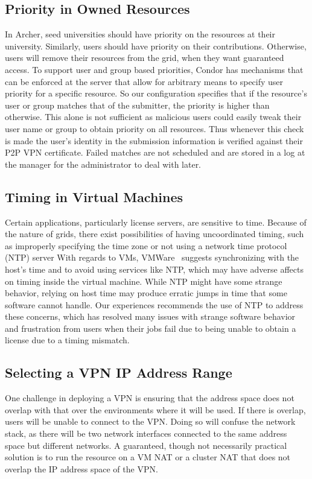 \documentclass[twocolumn]{svjour3}
\begin{document}
\subsection{Priority in Owned Resources}

In Archer, seed universities should have priority on the resources at their
university.  Similarly, users should have priority on their contributions.
Otherwise, users will remove their resources from the grid, when they want
guaranteed access.  To support user and group based priorities, Condor has
mechanisms that can be enforced at the server that allow for arbitrary means to
specify user priority for a specific resource.  So our configuration specifies
that if the resource's user or group matches that of the submitter, the
priority is higher than otherwise.  This alone is not sufficient as malicious
users could easily tweak their user name or group to obtain priority on all
resources.  Thus whenever this check is made the user's identity in the
submission information is verified against their P2P VPN certificate.  Failed
matches are not scheduled and are stored in a log at the manager for the
administrator to deal with later.

\subsection{Timing in Virtual Machines}

Certain applications, particularly license servers, are sensitive to time.
Because of the nature of grids, there exist possibilities of having
uncoordinated timing, such as improperly specifying the time zone or not using
a network time protocol (NTP) server With regards to VMs,
VMWare~\cite{vmware_timing} suggests synchronizing with the host's time and to
avoid using services like NTP, which may have adverse affects on timing inside
the virtual machine.  While NTP might have some strange behavior, relying on
host time may produce erratic jumps in time that some software cannot handle.
Our experiences recommends the use of NTP to address these concerns, which has
resolved many issues with strange software behavior and frustration from users
when their jobs fail due to being unable to obtain a license due to a timing
mismatch.

\subsection{Selecting a VPN IP Address Range}

One challenge in deploying a VPN is ensuring that the address space does not
overlap with that over the environments where it will be used.  If there is
overlap, users will be unable to connect to the VPN.  Doing so will confuse the
network stack, as there will be two network interfaces connected to the same
address space but different networks.  A guaranteed, though not necessarily
practical solution is to run the resource on a VM NAT or a cluster NAT that
does not overlap the IP address space of the VPN.
\end{document}
